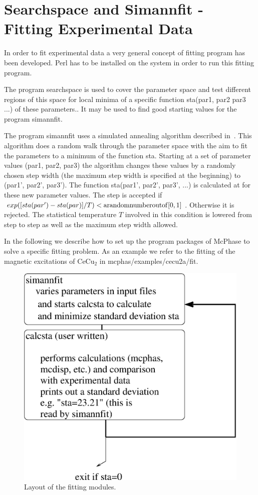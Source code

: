 \section{{\prg Searchspace and Simannfit} - Fitting Experimental Data}\label{simannfit}

In order to fit experimental data a very general concept of fitting program 
has been developed. 
{\prg Perl} has to be installed on the system in order to run
this fitting program.

The program {\prg searchspace} is used to cover the parameter space and test
different regions of this space for local minima 
of a specific function {\prg sta(par1, par2 par3 ...)} of
these parameters.. It may be used to 
find good starting values for the program {\prg simannfit}.

The program {\prg simannfit} uses a simulated annealing algorithm described
in~\cite{kirkpatrick83-671}.
This algorithm does a random walk through the parameter space 
with the aim to fit the parameters to  a minimum of the function {\prg sta}.
  Starting at a set of parameter values (par1, par2, par3) the algorithm
changes these values by a randomly chosen step width (the maximum step width
is specified at the beginning) to (par1', par2', par3').
 The function {\prg sta(par1', par2', par3', ...)} is calculated at
for these new parameter values. The step is accepted if 
$exp([sta(par')-sta(par)]/T)<{\rm a random number out of} [0,1]$.
Otherwise it is rejected. The statistical temperature $T$ involved in this
condition is lowered from step to step as well as the maximum step width allowed.

In the following we describe how to set up the program packages of {\prg McPhase} to
solve a specific fitting problem.
As an example we refer to the fitting of the magnetic 
excitations of CeCu$_2$ in {\prg mcphas/examples/cecu2a/fit}. 

\begin{figure}[hb]\label{safit}
\includegraphics[angle=0,width=0.7\columnwidth]{figsrc/simannfit.eps}
\caption{Layout of the fitting modules.}
\end{figure}


